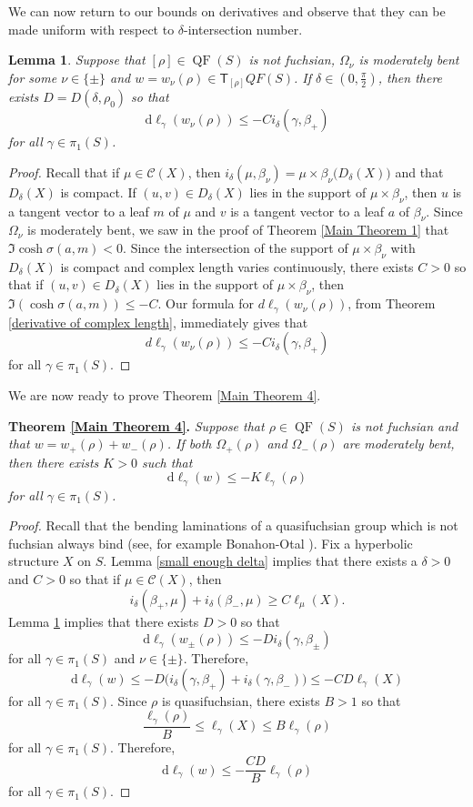 \documentclass{amsart}
\theoremstyle{plain}
\newtheorem{lemma}[proposition]{Lemma}
\theoremstyle{definition}
\theoremstyle{remark}
\newcommand{\QF}{\operatorname{QF}}
\renewcommand{\sf}[1]{{\mathsf{#1}}}
\newcommand{\<}{\left <}
\renewcommand{\>}{\right >}
\newcommand{\g}{\gamma}
\newcommand{\dd}{{\mathrm{d}}}
\begin{document}
We can now return to our bounds on derivatives and observe that they can be made uniform
with respect to $\delta$-intersection number.

\begin{lemma}
\label{uniform variation}
Suppose that $[\rho]\in \QF(S)$ is not fuchsian,
$\Omega_\nu$ is moderately bent for some $\nu\in\{\pm\}$ and $w=w_\nu(\rho)\in \sf T_{[\rho]} QF(S)$.
If $\delta\in \left(0,\frac{\pi}{2}\right)$, then  there exists $D=D(\delta,\rho_0)$ so that 
$$\dd\ell_\gamma(w_\nu(\rho)) \leq - C i_\delta(\gamma,\beta_+)$$
for all $\gamma\in\pi_1(S)$.
\end{lemma}


\begin{proof}
Recall that  if $\mu\in\mathcal C(X)$, then
$i_\delta(\mu,\beta_\nu)=\mu\times \beta_\nu \big(D_\delta(X)\big)$ and that $D_\delta(X)$ is compact.
If $(u,v)\in D_\delta(X)$ lies in the support of $\mu\times \beta_\nu$, then $u$ is a tangent vector to a leaf $m$ of $\mu$ 
and $v$ is a tangent vector to a leaf $a$ of $\beta_\nu$. Since $\Omega_\nu$ is moderately bent,
we saw in the proof of Theorem \ref{Main Theorem 1} that  $\Im\cosh \sigma(a,m) < 0$. 
Since the intersection of the support of $\mu\times \beta_\nu$ with $D_\delta(X)$ is compact and complex length varies continuously,
there exists $C>0$ so that if $(u,v)\in D_\delta(X)$ lies in the support of $\mu\times \beta_\nu$, then
$\Im\left(\cosh \sigma(a,m)\right)\le -C$.
Our formula for $d\ell_\gamma(w_\nu(\rho))$, from Theorem \ref{derivative of complex length}, immediately gives that
$$d\ell_\gamma(w_\nu(\rho)) \leq -C i_\delta(\gamma,\beta_+)$$
for all $\gamma\in\pi_1(S)$.
\end{proof}

We are now ready to prove Theorem \ref{Main Theorem 4}.

\medskip\noindent
{\bf Theorem \ref{Main Theorem 4}.} {\em
Suppose that $\rho\in \QF(S)$ is not fuchsian and that $w = w_+(\rho)+w_-(\rho)$. If both $\Omega_+(\rho)$ and $\Omega_-(\rho)$ are
moderately bent, then there exists  $K > 0$ such that
$$\dd\ell_\g(w) \leq  -K \ell_\g(\rho)$$
for all $\gamma\in\pi_1(S)$.}


\begin{proof}
Recall that the bending laminations of a quasifuchsian group which is not fuchsian always bind 
(see, for example Bonahon-Otal \cite[Proposition 4]{BO}).
Fix a hyperbolic structure  $X$ on $S$.
Lemma \ref{small enough delta} implies that  there exists a $\delta > 0$  and $C>0$ so that if $\mu\in\mathcal C(X)$, then
$$i_\delta(\beta_+,\mu)+i_\delta(\beta_-,\mu) \geq C \ell_\mu(X).$$
Lemma \ref{uniform variation} implies that there exists $D>0$ so that   
$$\dd\ell_\g(w_{\pm}(\rho)) \leq - D i_\delta(\g,\beta_\pm)$$
for all $\g\in\pi_1(S)$ and $\nu\in\{\pm\}$. 
Therefore,
$$\dd\ell_\g(w) \leq - D \Big( i_\delta(\g,\beta_+)+i_\delta(\g,\beta_-)\Big)\leq -CD \ell_\g(X)$$
for all $\g\in\pi_1(S)$.
Since $\rho$ is quasifuchsian, there exists $B>1$ so that
$$\frac{\ell_\g(\rho)}{B}\le \ell_\g(X)\le B\ell_\g(\rho)$$
for all $\g\in \pi_1(S)$.
Therefore,
$$\dd\ell_\g(w) \leq  -\frac{CD}{B} \ell_\g(\rho)$$
for all $\g\in\pi_1(S)$.
\end{proof}
\end{document}

